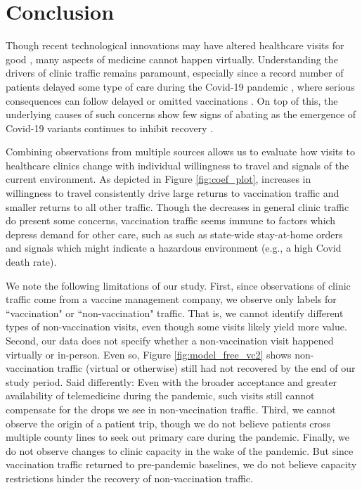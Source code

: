 \section{Conclusion} \label{VC2_Conc}
 Though recent technological innovations may have altered healthcare visits for good \citep{WSJ_checkup}, many aspects of medicine cannot happen virtually. Understanding the drivers of clinic traffic remains paramount, especially since a record number of patients delayed some type of care during the Covid-19 pandemic \citep{Findling2020}, where serious consequences can follow delayed or omitted vaccinations \citep{Salmon2015}. On top of this, the underlying causes of such concerns show few signs of abating as the emergence of Covid-19 variants continues to inhibit recovery \citep{WSJ_delta}.
 
 Combining observations from multiple sources allows us to evaluate how visits to healthcare clinics change with individual willingness to travel and signals of the current environment. As depicted in Figure \ref{fig:coef_plot}, increases in willingness to travel consistently drive large returns to vaccination traffic and smaller returns to all other traffic. Though the decreases in general clinic traffic do present some concerns, vaccination traffic seems immune to factors which depress demand for other care, such as such as state-wide stay-at-home orders and signals which might indicate a hazardous environment (e.g., a high Covid death rate). 
 
 We note the following limitations of our study. First, since observations of clinic traffic come from a vaccine management company, we observe only labels for “vaccination" or “non-vaccination" traffic. That is, we cannot identify different types of non-vaccination visits, even though some visits likely yield more value. Second, our data does not specify whether a non-vaccination visit happened virtually or in-person. Even so, Figure \ref{fig:model_free_vc2} shows non-vaccination traffic (virtual or otherwise) still had not recovered by the end of our study period. Said differently: Even with the broader acceptance and greater availability of telemedicine during the pandemic, such visits still cannot compensate for the drops we see in non-vaccination traffic. Third, we cannot observe the origin of a patient trip, though we do not believe patients cross multiple county lines to seek out primary care during the pandemic. Finally, we do not observe changes to clinic capacity in the wake of the pandemic. But since vaccination traffic returned to pre-pandemic baselines, we do not believe capacity restrictions hinder the recovery of non-vaccination traffic.
 
